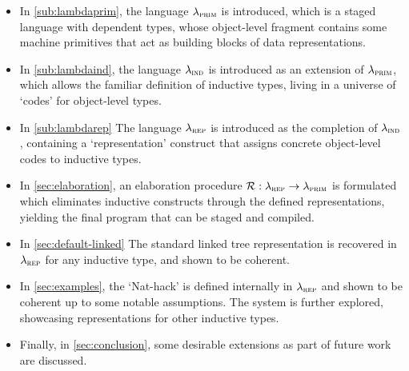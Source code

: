 \begin{itemize}
  \item In \cref{sub:lambdaprim}, the language $\lambda_{\textsc{prim}}$ is introduced, which is a
        staged language with dependent types, whose object-level fragment contains some
        machine primitives that act as building blocks of data representations.
  \item In \cref{sub:lambdaind}, the language $\lambda_{\textsc{ind}}$ is introduced as an
        extension of $\lambda_{\textsc{prim}}$, which allows the familiar definition of inductive
        types, living in a universe of `codes' for object-level types.
  \item In \cref{sub:lambdarep} The language $\lambda_{\textsc{rep}}$ is introduced as the
        completion of $\lambda_{\textsc{ind}}$, containing a `representation' construct that
        assigns concrete object-level codes to inductive types.
  \item In \cref{sec:elaboration}, an elaboration procedure $\mathcal{R} {} : \lambda_{\textsc{rep}} \to
          \lambda_{\textsc{prim}}$ is formulated which eliminates inductive constructs through the
        defined representations, yielding the final program that can be staged and
        compiled.
  \item In \cref{sec:default-linked} The standard linked tree representation is
        recovered in $\lambda_{\textsc{rep}}$ for any inductive type, and shown to be coherent.
  \item In \cref{sec:examples}, the `Nat-hack' is defined internally in $\lambda_{\textsc{rep}}$
        and shown to be coherent up to some notable assumptions. The system is further
        explored, showcasing representations for other inductive types.
  \item Finally, in \cref{sec:conclusion}, some desirable extensions as part of future
        work are discussed.
\end{itemize}
